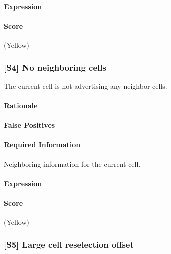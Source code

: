 \documentclass[a4paper,11pt,notitlepage,bigheadings,oneside]{scrartcl}
\begin{document}
\paragraph{Expression}

\TBD

\paragraph{Score}

\TBD{} (Yellow)

\subsubsection{[S4] No neighboring cells}

The current cell is not advertising any neighbor cells.

\paragraph{Rationale}

\TBD{}

\paragraph{False Positives}

\TBD{}


\paragraph{Required Information}

Neighboring information for the current cell.

\paragraph{Expression}

\TBD

\paragraph{Score}

\TBD{} (Yellow)

\subsubsection{[S5] Large cell reselection offset}
\end{document}
